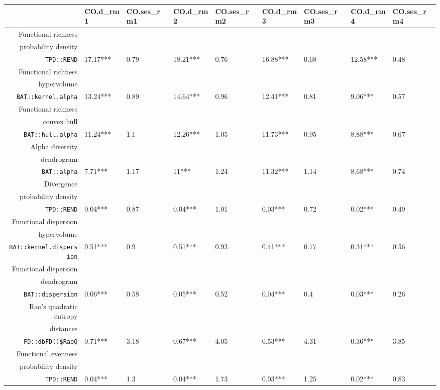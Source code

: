 \begin{table}[ht]
\centering
\scriptsize
\begin{tabular}{rllllllll}
  \hline
 & CO.d\_rm1 & CO.ses\_rm1 & CO.d\_rm2 & CO.ses\_rm2 & CO.d\_rm3 & CO.ses\_rm3 & CO.d\_rm4 & CO.ses\_rm4 \\ 
  \hline
Functional richness\\ probability density\\ \texttt{TPD::REND} & 17.17*** & 0.79 & 18.21*** & 0.76 & 16.88*** & 0.68 & 12.58*** & 0.48 \\ 
  Functional richness\\ hypervolume\\ \texttt{BAT::kernel.alpha} & 13.24*** & 0.89 & 14.64*** & 0.96 & 12.41*** & 0.81 & 9.06*** & 0.57 \\ 
  Functional richness\\ convex hull\\ \texttt{BAT::hull.alpha} & 11.24*** & 1.1 & 12.26*** & 1.05 & 11.73*** & 0.95 & 8.88*** & 0.67 \\ 
  Alpha diversity\\ dendrogram\\ \texttt{BAT::alpha} & 7.71*** & 1.17 & 11*** & 1.24 & 11.32*** & 1.14 & 8.68*** & 0.74 \\ 
  Divergence\\ probability density\\ \texttt{TPD::REND} & 0.04*** & 0.87 & 0.04*** & 1.01 & 0.03*** & 0.72 & 0.02*** & 0.49 \\ 
  Functional dispersion\\ hypervolume\\ \texttt{BAT::kernel.dispersion} & 0.51*** & 0.9 & 0.51*** & 0.93 & 0.41*** & 0.77 & 0.31*** & 0.56 \\ 
  Functional dispersion\\ dendrogram\\ \texttt{BAT::dispersion} & 0.06*** & 0.58 & 0.05*** & 0.52 & 0.04*** & 0.4 & 0.03*** & 0.26 \\ 
  Rao's quadratic entropy\\ distances\\ \texttt{FD::dbFD()\$RaoQ} & 0.71*** & 3.18 & 0.67*** & 4.05 & 0.53*** & 4.31 & 0.36*** & 3.85 \\ 
  Functional evenness\\ probability density\\ \texttt{TPD::REND} & 0.04*** & 1.3 & 0.04*** & 1.73 & 0.03*** & 1.25 & 0.02*** & 0.83 \\ 

\end{tabular}
\end{table}
